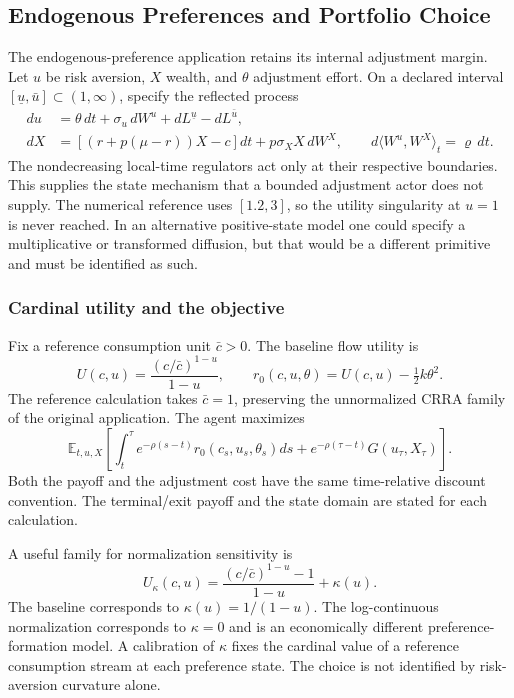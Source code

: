 \documentclass[ecta,nameyear,draft]{econsocart}
\theoremstyle{definition}
\theoremstyle{remark}
\newcommand{\E}{\mathbb E}
\begin{document}
\subsection{Endogenous Preferences and Portfolio Choice}\label{sec:ndu}
The endogenous-preference application retains its internal adjustment margin. Let $u$ be risk aversion, $X$ wealth, and $\theta$ adjustment effort. On a declared interval $[\underline u,\bar u]\subset(1,\infty)$, specify the reflected process
\begin{align}
 du&=\theta\,dt+\sigma_u\,dW^u+dL^{\underline u}-dL^{\bar u},\label{eq:ndustate}\\
 dX&=[(r+p(\mu-r))X-c]dt+p\sigma_X X\,dW^X,
 \qquad d\langle W^u,W^X\rangle_t=\varrho\,dt.
\end{align}
The nondecreasing local-time regulators act only at their respective boundaries. This supplies the state mechanism that a bounded adjustment actor does not supply. The numerical reference uses $[1.2,3]$, so the utility singularity at $u=1$ is never reached. In an alternative positive-state model one could specify a multiplicative or transformed diffusion, but that would be a different primitive and must be identified as such.

\subsubsection{Cardinal utility and the objective}
Fix a reference consumption unit $\bar c>0$. The baseline flow utility is
\begin{equation}\label{eq:nduutility}
 U(c,u)=\frac{(c/\bar c)^{1-u}}{1-u},\qquad
 r_0(c,u,\theta)=U(c,u)-\tfrac12 k\theta^2.
\end{equation}
The reference calculation takes $\bar c=1$, preserving the unnormalized CRRA family of the original application. The agent maximizes
\begin{equation}\label{eq:nduobjective}
 \E_{t,u,X}\left[\int_t^\tau e^{-\rho(s-t)}r_0(c_s,u_s,\theta_s)ds
        +e^{-\rho(\tau-t)}G(u_\tau,X_\tau)\right].
\end{equation}
Both the payoff and the adjustment cost have the same time-relative discount convention. The terminal/exit payoff and the state domain are stated for each calculation.

A useful family for normalization sensitivity is
\[
 U_\kappa(c,u)=\frac{(c/\bar c)^{1-u}-1}{1-u}+\kappa(u).
\]
The baseline corresponds to $\kappa(u)=1/(1-u)$. The log-continuous normalization corresponds to $\kappa=0$ and is an economically different preference-formation model. A calibration of $\kappa$ fixes the cardinal value of a reference consumption stream at each preference state. The choice is not identified by risk-aversion curvature alone.
\end{document}
